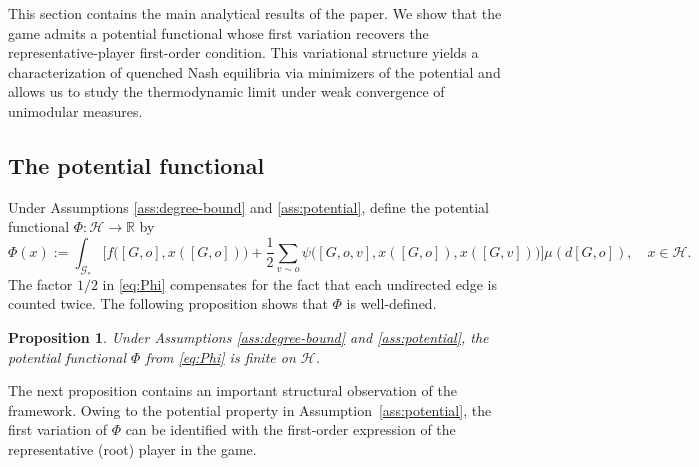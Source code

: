 \documentclass[11pt]{article}
\newcommand{\R}{{\mathbb R}}
\newtheorem{proposition}[theorem]{Proposition}
\numberwithin{equation}{section}
\begin{document}
This section contains the main analytical results of the paper. We show that the game admits a potential functional whose first variation recovers the representative-player first-order condition. This variational structure yields a characterization of quenched Nash equilibria via minimizers of the potential and allows us to study the thermodynamic limit under weak convergence of unimodular measures.

\subsection{The potential functional}

Under Assumptions \ref{ass:degree-bound} and \ref{ass:potential}, define the potential functional $\Phi:\mathcal{H}\to\R$ by
\begin{equation} \label{eq:Phi}
\Phi(x)
:=
\int_{\mathcal G_\ast}
\bigg[
f\big([G,o],x([G,o])\big)
+
\frac12\sum_{v\sim o}\psi\big([G,o,v],x([G,o]),x([G,v])\big)
\bigg]
\mu(d[G,o]),\quad x\in\mathcal{H}.
\end{equation}
The factor \(1/2\) in \eqref{eq:Phi} compensates for the fact that each undirected edge is counted twice. The following proposition shows that $\Phi$ is well-defined.
\begin{proposition} \label{prop:Phi-finite}
Under Assumptions \ref{ass:degree-bound} and \ref{ass:potential}, the potential functional \(\Phi\) from \eqref{eq:Phi} is finite on \(\mathcal H\).
\end{proposition}

The next proposition contains an important structural observation of the framework. Owing to the potential property in Assumption~\ref{ass:potential}, the first variation of \(\Phi\) can be identified with the first-order expression of the representative (root) player in the game.
\end{document}
